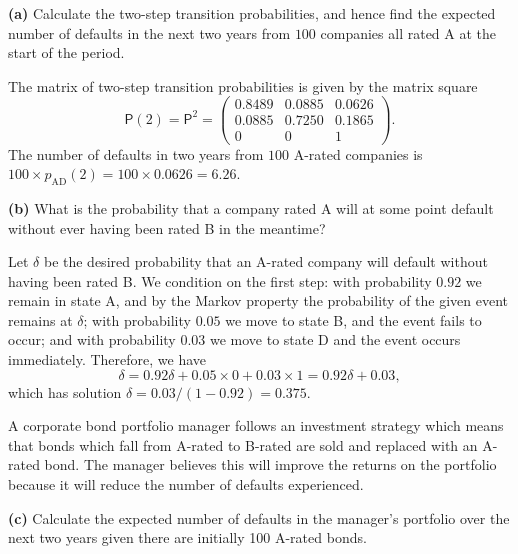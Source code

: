 \documentclass[
  a4paper,
]{article}
\theoremstyle{definition}
\theoremstyle{definition}
\theoremstyle{definition}
\theoremstyle{remark}
\begin{document}
\textbf{(a)} Calculate the two-step transition probabilities, and hence find the expected number of defaults in the next two years from \(100\) companies all rated A at the start of the period.

\begin{myanswers}

The matrix of two-step transition probabilities is given by the matrix square
\[\mathsf P(2) = \mathsf P^2= \begin{pmatrix} 0.8489&0.0885&0.0626\\
0.0885&0.7250&0.1865\\
0&0&1 \end{pmatrix}. \]
The number of defaults in two years from \(100\) A-rated companies is \(100 \times p_{\mathrm{AD}}(2) = 100 \times 0.0626 = 6.26\).

\end{myanswers}

\textbf{(b)} What is the probability that a company rated A will at some point default without ever having been rated B in the meantime?

\begin{myanswers}

Let \(\delta\) be the desired probability that an A-rated company will default without having been rated B. We condition on the first step: with probability \(0.92\) we remain in state A, and by the Markov property the probability of the given event remains at \(\delta\); with probability \(0.05\) we move to state B, and the event fails to occur; and with probability \(0.03\) we move to state D and the event occurs immediately. Therefore, we have
\[ \delta = 0.92\delta + 0.05\times 0 + 0.03 \times 1 = 0.92\delta + 0.03 ,  \]
which has solution \(\delta = 0.03/(1-0.92) = 0.375\).

\end{myanswers}

A corporate bond portfolio manager follows an investment strategy which means that bonds which fall from A-rated to B-rated are sold and replaced with an A-rated bond. The manager believes this will improve the returns on the portfolio because it will reduce the number of defaults experienced.

\textbf{(c)} Calculate the expected number of defaults in the manager's portfolio over the next two years given there are initially 100 A-rated bonds.
\end{document}
